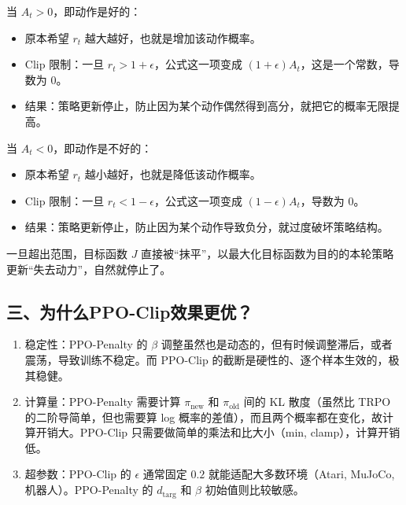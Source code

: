 当 \(A_t>0\)，即动作是好的：

\begin{itemize}
\tightlist
\item
  原本希望 \(r_t\) 越大越好，也就是增加该动作概率。
\item
  Clip 限制：一旦 \(r_t>1+\epsilon\)，公式这一项变成 \((1+\epsilon)A_t\)，这是一个常数，导数为 \(0\)。
\item
  结果：策略更新停止，防止因为某个动作偶然得到高分，就把它的概率无限提高。
\end{itemize}

当 \(A_t<0\)，即动作是不好的：

\begin{itemize}
\tightlist
\item
  原本希望 \(r_t\) 越小越好，也就是降低该动作概率。
\item
  Clip 限制：一旦 \(r_t<1-\epsilon\)，公式这一项变成 \((1-\epsilon)A_t\)，导数为 \(0\)。
\item
  结果：策略更新停止，防止因为某个动作导致负分，就过度破坏策略结构。
\end{itemize}

一旦超出范围，目标函数 \(J\) 直接被``抹平''，以最大化目标函数为目的的本轮策略更新``失去动力''，自然就停止了。

\hypertarget{ux4e09ux4e3aux4ec0ux4e48ppo-clipux6548ux679cux66f4ux4f18}{%
\subsection{三、为什么PPO-Clip效果更优？}\label{ux4e09ux4e3aux4ec0ux4e48ppo-clipux6548ux679cux66f4ux4f18}}

\begin{enumerate}
\def\labelenumi{\arabic{enumi}.}
\item
  稳定性：PPO-Penalty 的 \(\beta\) 调整虽然也是动态的，但有时候调整滞后，或者震荡，导致训练不稳定。而 PPO-Clip 的截断是硬性的、逐个样本生效的，极其稳健。
\item
  计算量：PPO-Penalty 需要计算 \(\pi_{\mathrm{new}}\) 和 \(\pi_{\mathrm{old}}\) 间的 KL 散度（虽然比 TRPO 的二阶导简单，但也需要算 log 概率的差值），而且两个概率都在变化，故计算开销大。PPO-Clip 只需要做简单的乘法和比大小（min, clamp），计算开销低。
\item
  超参数：PPO-Clip 的 \(\epsilon\) 通常固定 \(0.2\) 就能适配大多数环境（Atari, MuJoCo,机器人）。PPO-Penalty 的 \(d_{\mathrm{targ}}\) 和 \(\beta\) 初始值则比较敏感。
\end{enumerate}

